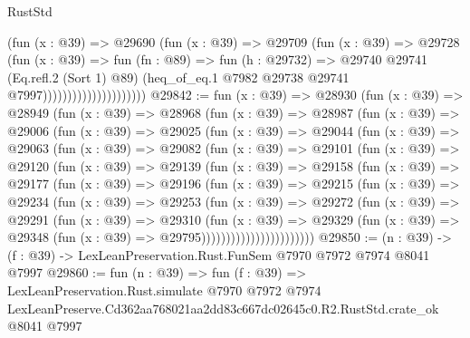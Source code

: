 \begin{lexlean}{RustStd}
\begin{coremodule}
                                    (fun (x : @39) =>
                                    @29690
                                      (fun (x : @39) =>
                                      @29709
                                        (fun (x : @39) =>
                                        @29728
                                          (fun (x : @39) =>
                                          fun (fn : @89) =>
                                          fun (h : @29732) =>
                                          @29740
                                            @29741
                                            (Eq.refl.{2} (Sort 1) @89)
                                            (heq_of_eq.{1}
                                              @7982
                                              @29738
                                              @29741
                                              @7997)))))))))))))))))))))
@29842 := fun (x : @39) =>
  @28930
    (fun (x : @39) =>
    @28949
      (fun (x : @39) =>
      @28968
        (fun (x : @39) =>
        @28987
          (fun (x : @39) =>
          @29006
            (fun (x : @39) =>
            @29025
              (fun (x : @39) =>
              @29044
                (fun (x : @39) =>
                @29063
                  (fun (x : @39) =>
                  @29082
                    (fun (x : @39) =>
                    @29101
                      (fun (x : @39) =>
                      @29120
                        (fun (x : @39) =>
                        @29139
                          (fun (x : @39) =>
                          @29158
                            (fun (x : @39) =>
                            @29177
                              (fun (x : @39) =>
                              @29196
                                (fun (x : @39) =>
                                @29215
                                  (fun (x : @39) =>
                                  @29234
                                    (fun (x : @39) =>
                                    @29253
                                      (fun (x : @39) =>
                                      @29272
                                        (fun (x : @39) =>
                                        @29291
                                          (fun (x : @39) =>
                                          @29310
                                            (fun (x : @39) =>
                                            @29329
                                              (fun (x : @39) =>
                                              @29348 (fun (x : @39) => @29795)))))))))))))))))))))))
@29850 := (n : @39) -> (f : @39) -> LexLeanPreservation.Rust.FunSem @7970 @7972 @7974 @8041 @7997
@29860 := fun (n : @39) =>
  fun (f : @39) =>
  LexLeanPreservation.Rust.simulate
    @7970
    @7972
    @7974
    LexLeanPreserve.Cd362aa768021aa2dd83c667dc02645c0.R2.RustStd.crate_ok
    @8041
    @7997
\end{coremodule}
\end{lexlean}
